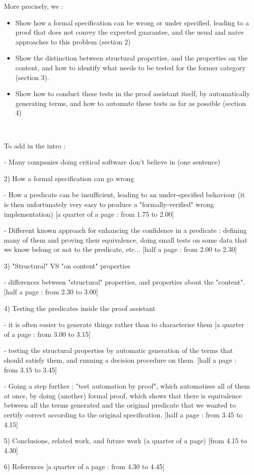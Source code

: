 More precisely, we :
\begin{itemize}
\item Show how a formal specification can be wrong or under specified, leading to a proof that does not convey the expected guarantee, and the usual and naive approaches to this problem (section 2)
\item Show the distinction between structural properties, and the properties on the content, and how to identify what needs to be tested for the former category (section 3).
\item Show how to conduct these tests in the proof assistant itself, by automatically generating terms, and how to automate these tests as far as possible (section 4)
\end{itemize}




\


To add in the intro :

- Many companies doing critical software don't believe in 
(one sentence)

2) How a formal specification can go wrong

- How a predicate can be insufficient, leading to an under-specified behaviour
(it is then unfortunately very easy to produce a "formally-verified" wrong implementation)
[a quarter of a page : from 1.75 to 2.00]

- Different known approach for enhancing the confidence in a predicate : defining many of them and proving their equivalence, doing small tests on some data that we know belong or not to the predicate, etc... 
[half a page : from 2.00 to 2.30]


3) "Structural" VS "on content" properties

- differences between "structural" properties, and properties about the "content".
[half a page : from 2.30 to 3.00]


4) Testing the predicates inside the proof assistant

- it is often easier to generate things rather than to characterise them 
[a quarter of a page : from 3.00 to 3.15]

- testing the structural properties by automatic generation of the terms that should satisfy them, and running a decision procedure on them.
[half a page : from 3.15 to 3.45]

- Going a step further : "test automation by proof", which automatises all of them at once, by doing (another) formal proof, which shows that there is equivalence between all the terms generated and the original predicate that we wanted to certify correct according to the original specification.
[half a page : from 3.45 to 4.15]


5) Conclusions, related work, and future work (a quarter of a page) 
[from 4.15 to 4.30]


6) References 
[a quarter of a page : from 4.30 to 4.45]



